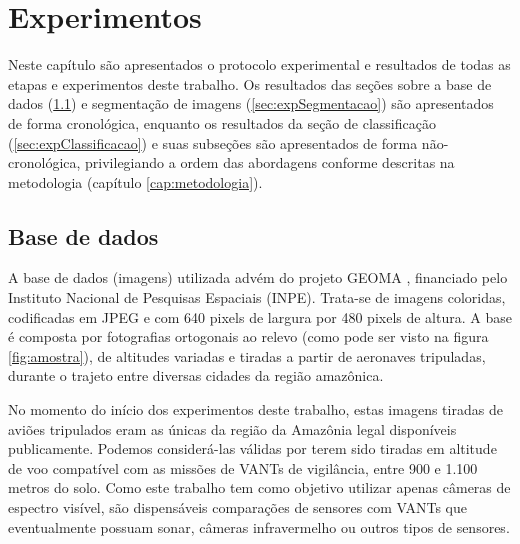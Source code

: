 \chapter{Experimentos}\label{cap:experimentos}

Neste capítulo são apresentados o protocolo experimental e resultados de todas as etapas e experimentos deste trabalho. Os resultados das seções sobre a base de dados (\ref{sec:expBase}) e segmentação de imagens (\ref{sec:expSegmentacao}) são apresentados de forma cronológica, enquanto os resultados da seção de classificação (\ref{sec:expClassificacao}) e suas subseções são apresentados de forma não-cronológica, privilegiando a ordem das abordagens conforme descritas na metodologia (capítulo \ref{cap:metodologia}).

\section{Base de dados}\label{sec:expBase}

A base de dados (imagens) utilizada advém do projeto GEOMA \cite{geoma}, financiado pelo Instituto Nacional de Pesquisas Espaciais (INPE). Trata-se de imagens coloridas, codificadas em JPEG e com 640 pixels de largura por 480 pixels de altura. A base é composta por fotografias ortogonais ao relevo (como pode ser visto na figura \ref{fig:amostra}), de altitudes variadas e tiradas a partir de aeronaves tripuladas, durante o trajeto entre diversas cidades da região amazônica.

No momento do início dos experimentos deste trabalho, estas imagens tiradas de aviões tripulados eram as únicas da região da Amazônia legal disponíveis publicamente. Podemos considerá-las válidas por terem sido tiradas em altitude de voo compatível com as missões de VANTs de vigilância, entre 900 e 1.100 metros do solo. Como este trabalho tem como objetivo utilizar apenas câmeras de espectro visível, são dispensáveis comparações de sensores com VANTs que eventualmente possuam sonar, câmeras infravermelho ou outros tipos de sensores.

